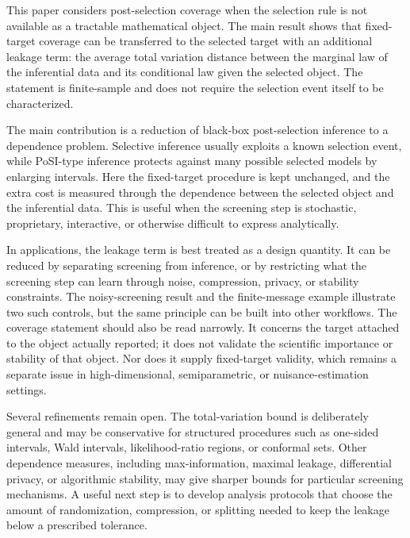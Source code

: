 \documentclass[11pt]{article}
\begin{document}
This paper considers post-selection coverage when the selection rule is not available as a tractable mathematical object. The main result shows that fixed-target coverage can be transferred to the selected target with an additional leakage term: the average total variation distance between the marginal law of the inferential data and its conditional law given the selected object. The statement is finite-sample and does not require the selection event itself to be characterized.

The main contribution is a reduction of black-box post-selection inference to a dependence problem. Selective inference usually exploits a known selection event, while PoSI-type inference protects against many possible selected models by enlarging intervals. Here the fixed-target procedure is kept unchanged, and the extra cost is measured through the dependence between the selected object and the inferential data. This is useful when the screening step is stochastic, proprietary, interactive, or otherwise difficult to express analytically.

In applications, the leakage term is best treated as a design quantity. It can be reduced by separating screening from inference, or by restricting what the screening step can learn through noise, compression, privacy, or stability constraints. The noisy-screening result and the finite-message example illustrate two such controls, but the same principle can be built into other workflows. The coverage statement should also be read narrowly. It concerns the target attached to the object actually reported; it does not validate the scientific importance or stability of that object. Nor does it supply fixed-target validity, which remains a separate issue in high-dimensional, semiparametric, or nuisance-estimation settings.

Several refinements remain open. The total-variation bound is deliberately general and may be conservative for structured procedures such as one-sided intervals, Wald intervals, likelihood-ratio regions, or conformal sets. Other dependence measures, including max-information, maximal leakage, differential privacy, or algorithmic stability, may give sharper bounds for particular screening mechanisms. A useful next step is to develop analysis protocols that choose the amount of randomization, compression, or splitting needed to keep the leakage below a prescribed tolerance.




\appendix
\end{document}
